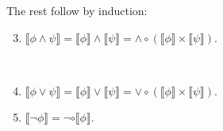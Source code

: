\begin{definition}[$\llbracket  \phi \rrbracket$]
\begin{enumerate}
		\end{enumerate}
	The rest follow by induction:
	\begin{enumerate}
			\setcounter{enumi}{2}
			\item $\llbracket \phi \land \psi \rrbracket = \llbracket \phi \rrbracket \land \llbracket \psi \rrbracket = \land \circ (\llbracket \phi \rrbracket \times \llbracket \psi \rrbracket) $.
			\begin{figure}[h]
					\centering
					\
				\end{figure}
			\item $\llbracket \phi \lor \psi \rrbracket = \llbracket \phi \rrbracket \lor \llbracket \psi \rrbracket = \lor \circ (\llbracket \phi \rrbracket \times \llbracket \psi \rrbracket) $.
			
			\item $\llbracket \neg \phi \rrbracket = \neg \circ \llbracket \phi \rrbracket$.
			

\end{enumerate}
\end{definition}
